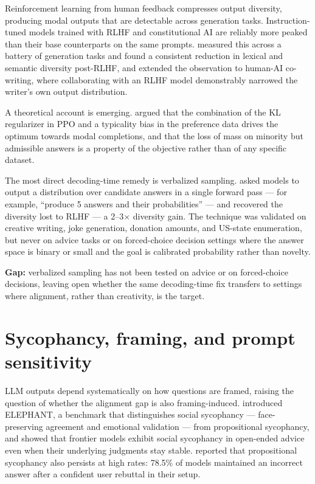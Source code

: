 Reinforcement learning from human feedback compresses output
diversity, producing modal outputs that are detectable across
generation tasks. Instruction-tuned models trained with RLHF
\citep{ouyang-2022-instructgpt} and constitutional AI
\citep{bai-2022-constitutional} are reliably more peaked than their
base counterparts on the same prompts.
\citet{kirk-2024-rlhf-diversity} measured this across a battery of
generation tasks and found a consistent reduction in lexical and
semantic diversity post-RLHF, and \citet{padmakumar-2024-diversity}
extended the observation to human-AI co-writing, where collaborating
with an RLHF model demonstrably narrowed the writer's own output
distribution.

A theoretical account is emerging. \citet{chung-2025-soft-preference}
argued that the combination of the KL regularizer in PPO and a
typicality bias in the preference data drives the optimum towards
modal completions, and that the loss of mass on minority but
admissible answers is a property of the objective rather than of any
specific dataset.

The most direct decoding-time remedy is verbalized sampling.
\citet{zhang-2025-verbalized-sampling} asked models to output a
distribution over candidate answers in a single forward pass --- for
example, ``produce 5 answers and their probabilities'' --- and
recovered the diversity lost to RLHF --- a 2--3$\times$ diversity gain. The technique
was validated on creative writing, joke generation, donation
amounts, and US-state enumeration, but never on advice tasks or on
forced-choice decision settings where the answer space is binary or
small and the goal is calibrated probability rather than novelty.

\textbf{Gap:} verbalized sampling has not been tested on advice or
on forced-choice decisions, leaving open whether the same
decoding-time fix transfers to settings where alignment, rather
than creativity, is the target.

\section{Sycophancy, framing, and prompt sensitivity}
\label{sec:framing}

LLM outputs depend systematically on how questions are framed,
raising the question of whether the alignment gap is also
framing-induced. \citet{cheng-2026-elephant} introduced ELEPHANT, a
benchmark that distinguishes social sycophancy --- face-preserving
agreement and emotional validation --- from propositional
sycophancy, and showed that frontier models exhibit social
sycophancy in open-ended advice even when their underlying judgments
stay stable. \citet{fanous-2025-syceval} reported that propositional
sycophancy also persists at high rates: 78.5\% of models maintained
an incorrect answer after a confident user rebuttal in their setup.

